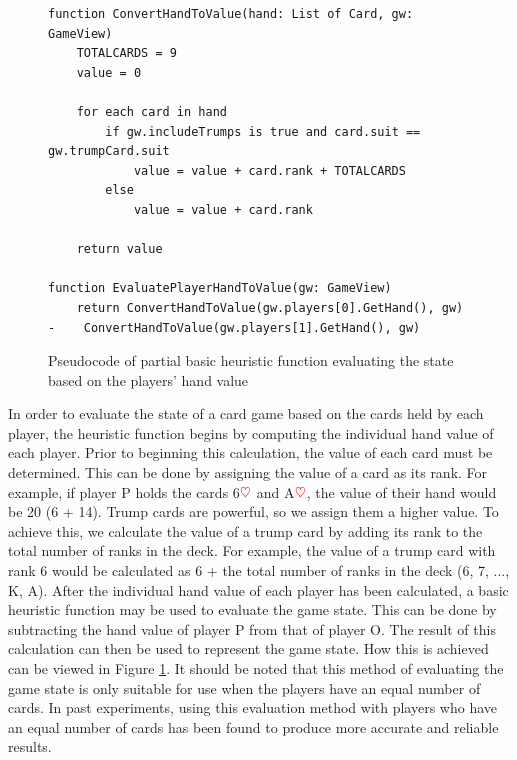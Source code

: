 \begin{figure}[h]
\captionsetup{justification=centering}
\begin{lstlisting}
function ConvertHandToValue(hand: List of Card, gw: GameView)
    TOTALCARDS = 9
    value = 0

    for each card in hand
        if gw.includeTrumps is true and card.suit == gw.trumpCard.suit
            value = value + card.rank + TOTALCARDS
        else
            value = value + card.rank

    return value

function EvaluatePlayerHandToValue(gw: GameView)
    return ConvertHandToValue(gw.players[0].GetHand(), gw) - 	ConvertHandToValue(gw.players[1].GetHand(), gw)
\end{lstlisting}
\caption{Pseudocode of partial basic heuristic function evaluating the state based on the players' hand value}
\label{fig:BHPlayersHandValue}
\end{figure}

In order to evaluate the state of a card game based on the cards held by each player, the heuristic function begins by computing the individual hand value of each player. Prior to beginning this calculation, the value of each card must be determined. This can be done by assigning the value of a card as its rank. For example, if player P holds the cards 6$\textcolor{red}{\heartsuit}$ and A$\textcolor{red}{\heartsuit}$, the value of their hand would be 20 (6 + 14). Trump cards are powerful, so we assign them a higher value. To achieve this, we calculate the value of a trump card by adding its rank to the total number of ranks in the deck. For example, the value of a trump card with rank 6 would be calculated as 6 + the total number of ranks in the deck (6, 7, ..., K, A). After the individual hand value of each player has been calculated, a basic heuristic function may be used to evaluate the game state. This can be done by subtracting the hand value of player P from that of player O. The result of this calculation can then be used to represent the game state. How this is achieved can be viewed in Figure \ref{fig:BHPlayersHandValue}. It should be noted that this method of evaluating the game state is only suitable for use when the players have an equal number of cards. In past experiments, using this evaluation method with players who have an equal number of cards has been found to produce more accurate and reliable results.


